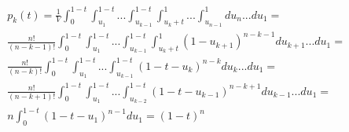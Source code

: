 \documentclass{llncs}
\begin{document}
\begin{eqnarray}
& p_k(t) = \displaystyle \frac{1}{V}\displaystyle \int_0^{1-t}\int_{{u_1}}^{1-t}...\int_{u_{k-1}}^{1-t}\int_{u_k+t}^1...\int_{u_{n-1}}^1 du_n... du_1 =  \nonumber \\ 
& \displaystyle \frac{n!}{(n-k-1)!}\displaystyle \int_0^{1-t}\int_{{u_1}}^{1-t}...\int_{u_{k-1}}^{1-t}\int_{u_k+t}^1 \left( 1-u_{k+1} \right)^{n-k-1} du_{k+1}...du_1 =  \nonumber \\
& \displaystyle \frac{n!}{(n-k)!}\displaystyle \int_0^{1-t}\int_{{u_1}}^{1-t}...\int_{u_{k-1}}^{1-t} \left( 1-t-u_{k} \right)^{n-k} du_k...du_1 =  \nonumber \\
& \displaystyle \frac{n!}{(n-k+1)!}\displaystyle \int_0^{1-t}\int_{{u_1}}^{1-t}...\int_{u_{k-2}}^{1-t} \left( 1-t-u_{k-1} \right)^{n-k+1} du_{k-1}...du_1 =  \nonumber \\
& \displaystyle n \int_0^{1-t}\left( 1-t-u_1 \right)^{n-1} du_1 = (1-t)^n \label{eq:p_k}
\end{eqnarray}

\end{document}
